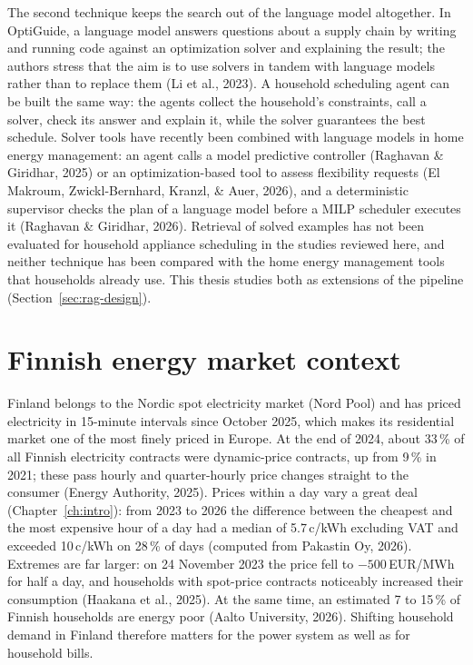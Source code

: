\documentclass[12pt,a4paper]{report}
\begin{document}
The second technique keeps the search out of the language model
altogether. In OptiGuide, a language model answers questions about a
supply chain by writing and running code against an optimization solver
and explaining the result; the authors stress that the aim is to use
solvers in tandem with language models rather than to replace them (Li
et al., 2023). A household scheduling agent can be built the same way:
the agents collect the household's constraints, call a solver, check
its answer and explain it, while the solver guarantees the best
schedule. Solver tools have recently been combined with language models
in home energy management: an agent calls a model predictive controller
(Raghavan \& Giridhar, 2025) or an optimization-based tool to assess
flexibility requests (El Makroum, Zwickl-Bernhard, Kranzl, \& Auer,
2026), and a deterministic supervisor checks the plan of a language
model before a MILP scheduler executes it (Raghavan \& Giridhar, 2026).
Retrieval of solved examples has not been evaluated for household
appliance scheduling in the studies reviewed here, and neither technique
has been compared with the home energy management tools that households
already use. This thesis studies both as extensions of the pipeline
(Section~\ref{sec:rag-design}).

\section{Finnish energy market context}

Finland belongs to the Nordic spot electricity market (Nord Pool) and
has priced electricity in 15-minute intervals since October 2025, which
makes its residential market one of the most finely priced in Europe. At
the end of 2024, about 33\,\% of all Finnish electricity contracts were
dynamic-price contracts, up from 9\,\% in 2021; these pass hourly and
quarter-hourly price changes straight to the consumer (Energy Authority,
2025). Prices within a day vary a great deal (Chapter~\ref{ch:intro}):
from 2023 to 2026 the difference between the cheapest and the most
expensive hour of a day had a median of 5.7\,c/kWh excluding VAT and
exceeded 10\,c/kWh on 28\,\% of days (computed from Pakastin Oy, 2026).
Extremes are far larger: on 24 November 2023 the price fell to
$-500$\,EUR/MWh for half a day, and households with spot-price contracts
noticeably increased their consumption (Haakana et al., 2025). At the same time, an
estimated 7 to 15\,\% of Finnish households are energy poor (Aalto
University, 2026). Shifting household demand in Finland therefore
matters for the power system as well as for household bills.
\end{document}
